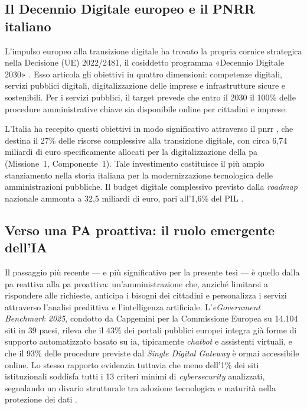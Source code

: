\subsection{Il Decennio Digitale europeo e il PNRR italiano}

L'impulso europeo alla transizione digitale ha trovato la propria cornice strategica nella Decisione (UE) 2022/2481, il cosiddetto programma «Decennio Digitale 2030» \parencite{DecisioneDecennioDigitale}. Esso articola gli obiettivi in quattro dimensioni: competenze digitali, servizi pubblici digitali, digitalizzazione delle imprese e infrastrutture sicure e sostenibili. Per i servizi pubblici, il target prevede che entro il 2030 il 100\% delle procedure amministrative chiave sia disponibile online per cittadini e imprese. 

L'Italia ha recepito questi obiettivi in modo significativo attraverso il \gls{pnrr} \parencite{PNRR}, che destina il 27\% delle risorse complessive alla transizione digitale, con circa 6,74 miliardi di euro specificamente allocati per la digitalizzazione della \gls{pa} (Missione~1, Componente~1). Tale investimento costituisce il più ampio stanziamento nella storia italiana per la modernizzazione tecnologica delle amministrazioni pubbliche. Il budget digitale complessivo previsto dalla \textit{roadmap} nazionale ammonta a 32,5 miliardi di euro, pari all'1,6\% del PIL \parencite{ItalyDigitalDecade2025}.

\subsection{Verso una PA proattiva: il ruolo emergente dell'IA}

Il passaggio più recente --- e più significativo per la presente tesi --- è quello dalla \gls{pa} reattiva alla \gls{pa} proattiva: un'amministrazione che, anziché limitarsi a rispondere alle richieste, anticipa i bisogni dei cittadini e personalizza i servizi attraverso l'analisi predittiva e l'intelligenza artificiale. L'\textit{eGovernment Benchmark 2025}, condotto da Capgemini per la Commissione Europea su 14.104 siti in 39 paesi, rileva che il 43\% dei portali pubblici europei integra già forme di supporto automatizzato basato su \gls{ia}, tipicamente \textit{chatbot} e assistenti virtuali, e che il 93\% delle procedure previste dal \textit{Single Digital Gateway} è ormai accessibile online. Lo stesso rapporto evidenzia tuttavia che meno dell'1\% dei siti istituzionali soddisfa tutti i 13 criteri minimi di \textit{cybersecurity} analizzati, segnalando un divario strutturale tra adozione tecnologica e maturità nella protezione dei dati \parencite{eGovBenchmark2025}.

